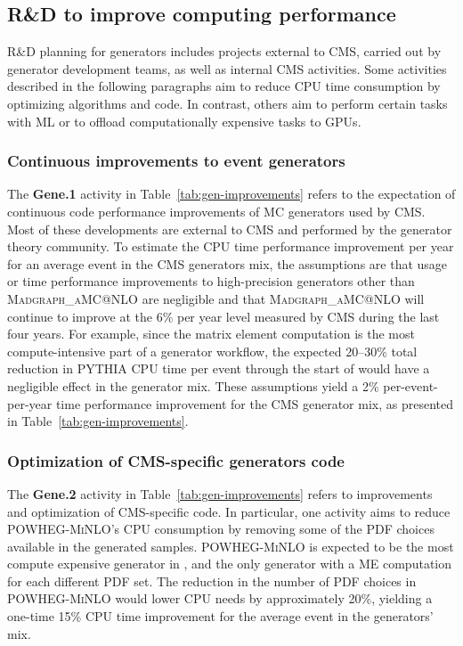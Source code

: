 \subsection{R\&D to improve computing performance}
\label{sec:gen-rnd}

R\&D planning for generators includes projects external to CMS, carried out by generator development teams, as well as internal CMS activities. Some activities described in the following paragraphs aim to reduce \gls{CPU} time consumption by optimizing algorithms and code. In contrast, others aim to perform certain tasks with \gls{ML} or to offload computationally expensive tasks to \glspl{GPU}.

\subsubsection{Continuous improvements to event generators}

The \textbf{Gene.1} activity in Table~\ref{tab:gen-improvements} refers to the expectation of continuous code performance improvements of \gls{MC} generators used by CMS. Most of these developments are external to CMS and performed by the generator theory community. To estimate the \gls{CPU} time performance improvement per year for an average event in the CMS generators mix, the assumptions are that usage or time performance improvements to high-precision generators other than \textsc{Madgraph\_aMC@NLO} are negligible and that \textsc{Madgraph\_aMC@NLO} will continue to improve at the 6\% per year level measured by CMS during the last four years. For example, since the matrix element computation is the most compute-intensive part of a generator workflow, the expected 20--30\% total reduction in \textsc{PYTHIA} \gls{CPU} time per event through the start of \RunFour would have a negligible effect in the generator mix.
These assumptions yield a 2\% per-event-per-year time performance improvement for the CMS generator mix, as presented in Table~\ref{tab:gen-improvements}.

\subsubsection{Optimization of CMS-specific generators code}

The \textbf{Gene.2} activity in Table~\ref{tab:gen-improvements} refers to improvements and optimization of CMS-specific code. In particular, one activity aims to reduce \textsc{POWHEG}-\textsc{MiNLO}'s \gls{CPU} consumption by removing some of the \gls{PDF} choices available in the generated samples.
\textsc{POWHEG}-\textsc{MiNLO} is expected to be the most compute expensive generator in \PhaseTwo, and the only generator with a \gls{ME} computation for each different \gls{PDF} set. The reduction in the number of \gls{PDF} choices in \textsc{POWHEG}-\textsc{MiNLO} would lower \gls{CPU} needs by approximately 20\%, yielding a one-time 15\% \gls{CPU} time improvement for the average event in the generators’ mix.


